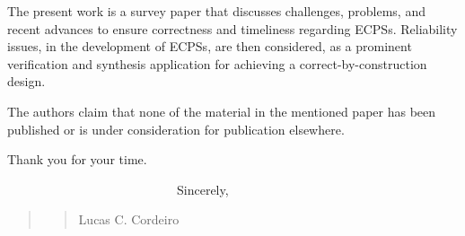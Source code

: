 \documentclass[11pt]{article}
\newcommand\vi{\vspace{\baselineskip}}
\begin{document}
\vi

The present work is a survey paper that discusses challenges, problems, and recent advances to ensure correctness and timeliness regarding ECPSs. Reliability issues, in the development of ECPSs, are then considered, as a prominent verification and synthesis application for achieving a correct-by-construction design.

\vi

The  authors  claim  that  none  of  the  material  in  the mentioned  paper  has  been  published  or  is  under  consideration for publication elsewhere.

\vi

Thank you for your time.

\vi\vi

\indent
~~~~~~~~~~~~~~~~~~~~~~~~~~~Sincerely,\\

\begin{quote}
\begin{quote}
\begin{flushright}



Lucas C. Cordeiro~~~~~~~
\end{flushright}
\end{quote}
\end{quote}


 
 
\end{document}

